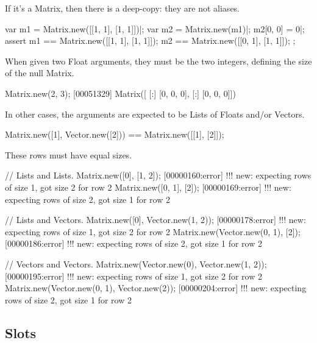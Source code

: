 If it's a Matrix, then there is a deep-copy: they are not aliases.

\begin{urbiscript}
var m1 = Matrix.new([[1, 1], [1, 1]])|;
var m2 = Matrix.new(m1)|;
m2[0, 0] = 0|;
assert
{
  m1 == Matrix.new([[1, 1], [1, 1]]);
  m2 == Matrix.new([[0, 1], [1, 1]]);
};
\end{urbiscript}

When given two Float arguments, they must be the two integers, defining the
size of the null Matrix.
\begin{urbiscript}
Matrix.new(2, 3);
[00051329] Matrix([
[:]  [0, 0, 0],
[:]  [0, 0, 0]])
\end{urbiscript}

In other cases, the arguments are expected to be Lists of Floats and/or
Vectors.

\begin{urbiassert}
Matrix.new([1], Vector.new([2])) == Matrix.new([[1], [2]]);
\end{urbiassert}

These rows must have equal sizes.

\begin{urbiscript}
// Lists and Lists.
Matrix.new([0], [1, 2]);
[00000160:error] !!! new: expecting rows of size 1, got size 2 for row 2
Matrix.new([0, 1], [2]);
[00000169:error] !!! new: expecting rows of size 2, got size 1 for row 2

// Lists and Vectors.
Matrix.new([0], Vector.new(1, 2));
[00000178:error] !!! new: expecting rows of size 1, got size 2 for row 2
Matrix.new(Vector.new(0, 1), [2]);
[00000186:error] !!! new: expecting rows of size 2, got size 1 for row 2

// Vectors and Vectors.
Matrix.new(Vector.new(0), Vector.new(1, 2));
[00000195:error] !!! new: expecting rows of size 1, got size 2 for row 2
Matrix.new(Vector.new(0, 1), Vector.new(2));
[00000204:error] !!! new: expecting rows of size 2, got size 1 for row 2
\end{urbiscript}

\subsection{Slots}

